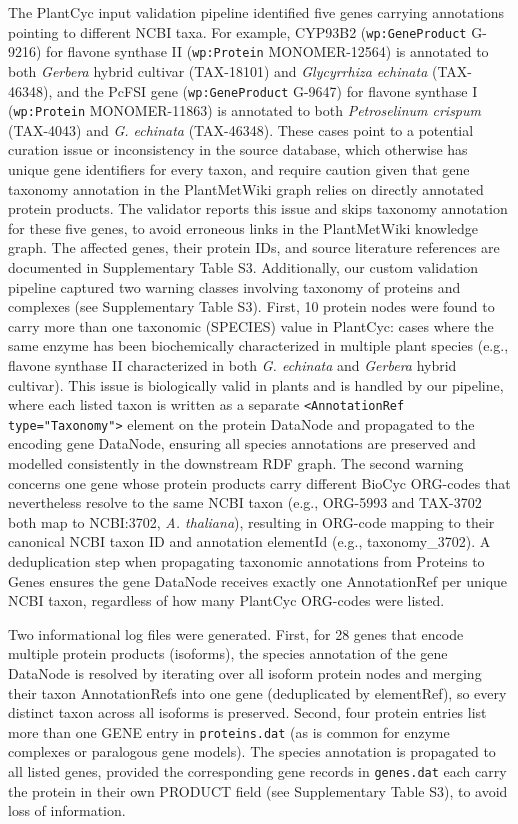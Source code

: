 \documentclass[11pt,a4paper]{article}
\begin{document}
The PlantCyc input validation pipeline identified five genes carrying annotations pointing to
different NCBI taxa. For example, CYP93B2 (\texttt{wp:GeneProduct} G-9216) for flavone synthase II
(\texttt{wp:Protein} MONOMER-12564) is annotated to both \textit{Gerbera} hybrid cultivar (TAX-18101)
and \textit{Glycyrrhiza echinata} (TAX-46348), and the PcFSI gene (\texttt{wp:GeneProduct} G-9647) for
flavone synthase I (\texttt{wp:Protein} MONOMER-11863) is annotated to both \textit{Petroselinum
crispum} (TAX-4043) and \textit{G. echinata} (TAX-46348). These cases point to a potential curation
issue or inconsistency in the source database, which otherwise has unique gene identifiers for every
taxon, and require caution given that gene taxonomy annotation in the PlantMetWiki graph relies on
directly annotated protein products. The validator reports this issue and skips taxonomy annotation
for these five genes, to avoid erroneous links in the PlantMetWiki knowledge graph. The affected
genes, their protein IDs, and source literature references are documented in Supplementary Table S3.
Additionally, our custom validation pipeline captured two warning classes involving taxonomy of
proteins and complexes (see Supplementary Table S3). First, 10 protein nodes were found to carry more
than one taxonomic (SPECIES) value in PlantCyc: cases where the same enzyme has been biochemically
characterized in multiple plant species (e.g., flavone synthase II characterized in both \textit{G.
echinata} and \textit{Gerbera} hybrid cultivar). This issue is biologically valid in plants and is
handled by our pipeline, where each listed taxon is written as a separate
\texttt{<AnnotationRef type="Taxonomy">} element on the protein DataNode and propagated to the
encoding gene DataNode, ensuring all species annotations are preserved and modelled consistently in
the downstream RDF graph. The second warning concerns one gene whose protein products carry different
BioCyc ORG-codes that nevertheless resolve to the same NCBI taxon (e.g., ORG-5993 and TAX-3702 both
map to NCBI:3702, \textit{A. thaliana}), resulting in ORG-code mapping to their canonical NCBI taxon
ID and annotation elementId (e.g., taxonomy\_3702). A deduplication step when propagating taxonomic
annotations from Proteins to Genes ensures the gene DataNode receives exactly one AnnotationRef per
unique NCBI taxon, regardless of how many PlantCyc ORG-codes were listed.

Two informational log files were generated. First, for 28 genes that encode multiple protein products
(isoforms), the species annotation of the gene DataNode is resolved by iterating over all isoform
protein nodes and merging their taxon AnnotationRefs into one gene (deduplicated by elementRef), so
every distinct taxon across all isoforms is preserved. Second, four protein entries list more than one
GENE entry in \texttt{proteins.dat} (as is common for enzyme complexes or paralogous gene models). The
species annotation is propagated to all listed genes, provided the corresponding gene records in
\texttt{genes.dat} each carry the protein in their own PRODUCT field (see Supplementary Table S3), to
avoid loss of information.
\end{document}
